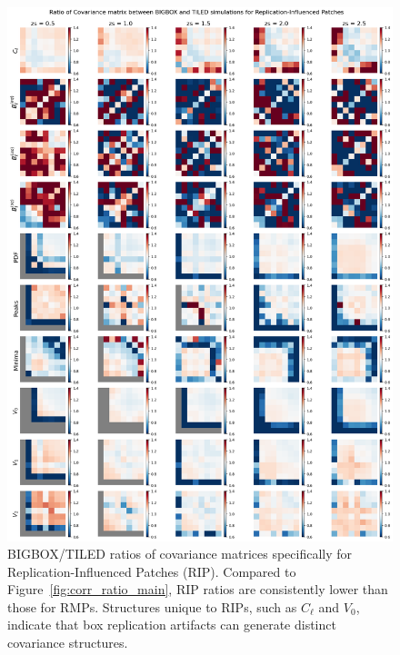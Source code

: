 \begin{figure}[p]
    \centering
    \includegraphics[width=\textwidth]{figures/results/cov_ratio_RIP.png}
    \caption[Covariance Ratios for RIP]{BIGBOX/TILED ratios of covariance matrices specifically for Replication-Influenced Patches (RIP). Compared to Figure~\ref{fig:corr_ratio_main}, RIP ratios are consistently lower than those for RMPs. Structures unique to RIPs, such as $C_\ell$ and $V_0$, indicate that box replication artifacts can generate distinct covariance structures.}
    \label{fig:boxreplication_cov_RIP}
\end{figure}

